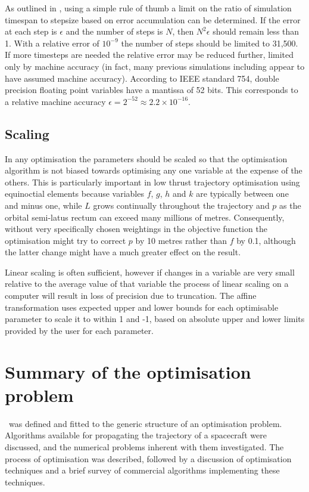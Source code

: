 As outlined in \textcite{Milani1987}, using a simple rule of thumb a limit on the ratio of simulation timespan to stepsize based on error accumulation can be determined. If the error at each step is $\epsilon$ and the number of steps is $N$, then $N^{2}\epsilon$ should remain less than 1. With a relative error of $10^{-9}$ the number of steps should be limited to 31,500. If more timesteps are needed the relative error may be reduced further, limited only by machine accuracy (in fact, many previous simulations including \citeauthor{Milani1987} appear to have assumed machine accuracy). According to IEEE standard 754, double precision floating point variables have a mantissa of 52 bits. This corresponds to a relative machine accuracy $\epsilon=2^{-52}\approx2.2\times10^{-16}$.

\subsection{Scaling} \label{sub:Scaling}

In any optimisation the parameters should be scaled so that the optimisation algorithm is not biased towards optimising any one variable at the expense of the others. This is particularly important in low thrust trajectory optimisation using equinoctial elements because variables $f$, $g$, $h$ and $k$ are typically between one and minus one, while $L$ grows continually throughout the trajectory and $p$ as the orbital semi-latus rectum can exceed many millions of metres. Consequently, without very specifically chosen weightings in the objective function the optimisation might try to correct $p$ by 10 metres rather than $f$ by 0.1, although the latter change might have a much greater effect on the result.

Linear scaling is often sufficient, however if changes in a variable are very small relative to the average value of that variable the process of linear scaling on a computer will result in loss of precision due to truncation. The affine transformation \parencite{ASTOS_guide} uses expected upper and lower bounds for each optimisable parameter to scale it to within 1 and -1, based on absolute upper and lower limits provided by the user for each parameter.

\section{Summary of the optimisation problem} \label{sec:Optimisation-Summary}

\BW\ was defined and fitted to the generic structure of an optimisation problem. Algorithms available for propagating the trajectory of a spacecraft were discussed, and the numerical problems inherent with them investigated. The process of optimisation was described, followed by a discussion of optimisation techniques and a brief survey of commercial algorithms implementing these techniques.
 
\clearpage